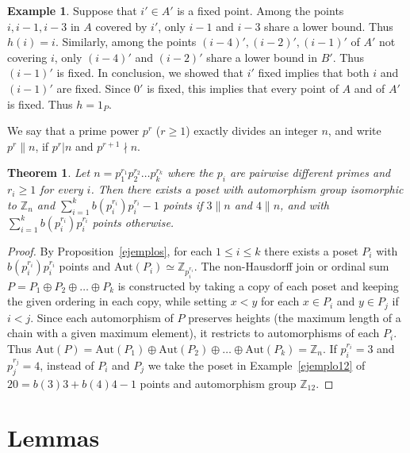 \documentclass[10pt,a4paper]{amsart}
\renewcommand{\varphi}{h}
\newcommand{\Z}{\mathbb{Z}}
\newcommand{\aut}{\textrm{Aut}}
\theoremstyle{plain}
\newtheorem{teo}[cdrthm]{Theorem}
\theoremstyle{definition}
\newtheorem{ej}[cdrthm]{Example}
\theoremstyle{remark}
\begin{document}
\begin{ej}
Suppose that $i'\in A'$ is a fixed point. Among the points $i,i-1,i-3$ in $A$ covered by $i'$, only $i-1$ and $i-3$ share a lower bound. Thus $\varphi(i)=i$. Similarly, among the points $(i-4)',(i-2)',(i-1)'$ of $A'$ not covering $i$, only $(i-4)'$ and $(i-2)'$ share a lower bound in $B'$. Thus $(i-1)'$ is fixed. In conclusion, we showed that $i'$ fixed implies that both $i$ and $(i-1)'$ are fixed. Since $0'$ is fixed, this implies that every point of $A$ and of $A'$ is fixed. Thus $\varphi=1_P$.  

\end{ej}

We say that a prime power $p^r$ ($r\ge 1$) exactly divides an integer $n$, and write $p^r\parallel n$, if $p^r| n$ and $p^{r+1}\nmid n$.

\begin{teo} \label{teoejemplos}
Let $n=p_1^{r_1}p_2^{r_2}\ldots p_k^{r_k}$ where the $p_i$ are pairwise different primes and~$r_i\ge 1$ for every $i$. Then there exists a poset with automorphism group isomorphic to $\Z_n$ and $\sum\limits_{i=1}^k b(p_i^{r_i})p_i^{r_i}-1$ points if $3\parallel n$ and $4\parallel n$, and with $\sum\limits_{i=1}^k b(p_i^{r_i})p_i^{r_i}$ points otherwise.
\end{teo}

\begin{proof}
By Proposition~\ref{ejemplos}, for each $1\le i\le k$ there exists a poset $P_i$ with $b(p_i^{r_i})p_i^{r_i}$ points and $\aut(P_i)\simeq \Z_{p_i^{r_i}}$. The non-Hausdorff join or ordinal sum $P=P_1\oplus P_2\oplus \ldots \oplus P_k$ is constructed by taking a copy of each poset and keeping the given ordering in each copy, while setting $x<y$ for each $x\in P_i$ and $y\in P_j$ if $i<j$. Since each automorphism of $P$ preserves heights (the maximum length of a chain with a given maximum element), it restricts to automorphisms of each $P_i$. Thus $\aut(P)=\aut(P_1)\oplus \aut(P_2) \oplus \ldots \oplus \aut(P_k)=\Z_n$. If $p_i^{r_i}=3$ and $p_j^{r_j}=4$, instead of $P_i$ and $P_j$ we take the poset in Example~\ref{ejemplo12} of $20=b(3)3+b(4)4-1$ points and automorphism group $\Z_{12}$.
\end{proof}

\section{Lemmas} \label{sectionlemmas}
\end{document}
